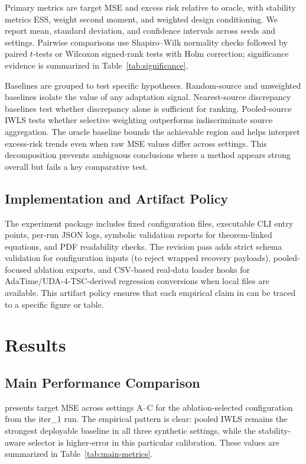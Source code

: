 \documentclass{article} %
\begin{document}
Primary metrics are target MSE and excess risk relative to oracle, with stability metrics ESS, weight second moment, and weighted design conditioning. We report mean, standard deviation, and confidence intervals across seeds and settings. Pairwise comparisons use Shapiro--Wilk normality checks followed by paired \(t\)-tests or Wilcoxon signed-rank tests with Holm correction; significance evidence is summarized in Table~\ref{tab:significance}.

Baselines are grouped to test specific hypotheses. Random-source and unweighted baselines isolate the value of any adaptation signal. Nearest-source discrepancy baselines test whether discrepancy alone is sufficient for ranking. Pooled-source IWLS tests whether selective weighting outperforms indiscriminate source aggregation. The oracle baseline bounds the achievable region and helps interpret excess-risk trends even when raw MSE values differ across settings. This decomposition prevents ambiguous conclusions where a method appears strong overall but fails a key comparative test.

\subsection{Implementation and Artifact Policy}
The experiment package includes fixed configuration files, executable CLI entry points, per-run JSON logs, symbolic validation reports for theorem-linked equations, and PDF readability checks. The revision pass adds strict schema validation for configuration inputs (to reject wrapped recovery payloads), pooled-focused ablation exports, and CSV-based real-data loader hooks for AdaTime/UDA-4-TSC-derived regression conversions when local files are available. This artifact policy ensures that each empirical claim in  can be traced to a specific figure or table.

\section{Results}
\label{sec:results}
\subsection{Main Performance Comparison}
 presents target MSE across settings A--C for the ablation-selected configuration from the iter\_1 run. The empirical pattern is clear: pooled IWLS remains the strongest deployable baseline in all three synthetic settings, while the stability-aware selector is higher-error in this particular calibration. These values are summarized in Table~\ref{tab:main-metrics}.
\end{document}
